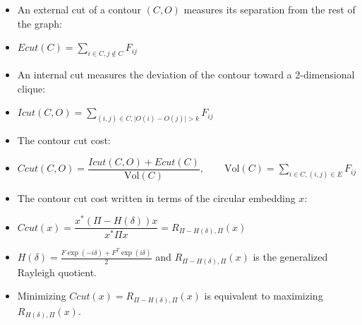 \documentclass[11pt, a4paper, landscape]{article}
\begin{document}
\NewPage{}
\vfill
\begin{itemize}
\item An external cut of a contour $(C, O)$ measures its separation from the rest of the graph:
\item[]
\begin{center}
$Ecut(C) = \sum\limits_{i \in C, j \notin C} F_{ij}$
\end{center}
\item An internal cut measures the deviation of the contour toward a 2-dimensional clique:
\item[]
\begin{center}
$Icut(C, O) = \sum\limits_{(i, j) \in C, \lvert O(i) - O(j) \rvert > k} F_{ij}$
\end{center}
\item The contour cut cost:
\item[]
\begin{center}
$Ccut(C, O) = \dfrac{Icut(C, O) + Ecut(C)}{\mathrm{Vol}(C)}, \qquad \mathrm{Vol}(C) = \sum_{i \in C, (i, j) \in E} F_{ij}$
\end{center}
\item The contour cut cost written in terms of the circular embedding $x$:
\item[]
\begin{center}
$Ccut(x) = \dfrac{x^*(\Pi - H(\delta))x}{x^* \Pi x} = R_{\Pi - H(\delta), \Pi}(x)$
\end{center}
\item $H(\delta) = \frac{F\exp(-i\delta) + F^T\exp(i\delta)}{2}$ and $R_{\Pi - H(\delta), \Pi}(x)$ is the generalized Rayleigh quotient.
\item Minimizing $Ccut(x) = R_{\Pi - H(\delta), \Pi}(x)$ is equivalent to maximizing $R_{H(\delta), \Pi}(x)$.
\end{itemize}
\vfill
\end{document}

